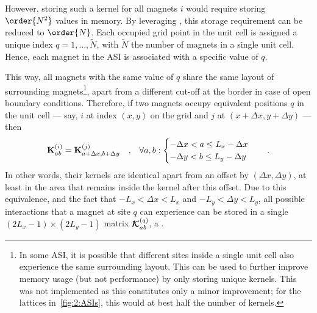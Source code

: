 However, storing such a kernel for all magnets $i$ would require storing $\order{N^2}$ values in memory. %
By leveraging , this storage requirement can be reduced to $\order{N}$.
Each occupied grid point in the unit cell is assigned a unique index $q = 1,\dots,\widetilde{N}$, with $\widetilde{N}$ the number of magnets in a single unit cell.
Hence, each magnet in the ASI is associated with a specific value of $q$. \par
This way, all magnets with the same value of $q$ share the same layout of surrounding magnets\footnote{
	In some ASI, it is possible that different sites inside a single unit cell also experience the same surrounding layout.
	This can be used to further improve memory usage (but not performance) by only storing unique kernels.
	This was not implemented as this constitutes only a minor improvement; for the lattices in~\cref{fig:2:ASIs}, this would at best half the number of kernels.
}, apart from a different cut-off at the border in case of open boundary conditions.
Therefore, if two magnets occupy equivalent positions $q$ in the unit cell --- say, $i$ at index $(x,y)$ on the grid and $j$ at $(x+\Delta x, y+\Delta y)$ --- then
\begin{equation}
	\label{eq:2:Kernel_equivalence}
	\boldsymbol{\mathbf{K}}^{(i)}_{ab} = \boldsymbol{\mathbf{K}}^{(j)}_{a+\Delta x,b+\Delta y} \quad \mathrm{,} \quad \forall a,b:
	\begin{cases}
		-\Delta x < a \leq L_x - \Delta x \\
		-\Delta y < b \leq L_y - \Delta y \\
	\end{cases} \quad\mathrm{.}
\end{equation}
In other words, their kernels are identical apart from an offset by $(\Delta x, \Delta y)$, at least in the area that remains inside the kernel after this offset.
Due to this equivalence, and the fact that $- L_x < \Delta x < L_x$ and $- L_y < \Delta y < L_y$, all possible interactions that a magnet at site $q$ can experience can be stored in a single $(2L_x-1) \times (2L_y-1)$ matrix $\boldsymbol{\mathbf{\mathcal{K}}}^{(q)}_{ab}$, a .


